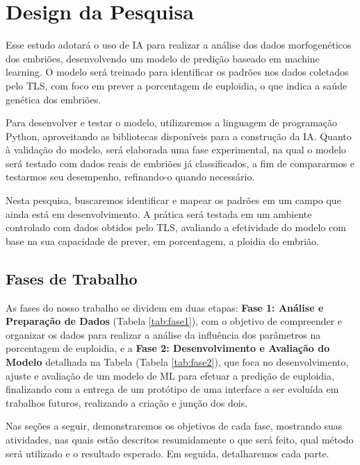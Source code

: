 \section{Design da Pesquisa}

Esse estudo adotará o uso de IA para realizar a análise dos dados morfogenéticos dos embriões, desenvolvendo um modelo de predição baseado em machine learning. O modelo será treinado para identificar os padrões nos dados coletados pelo TLS, com foco em prever a porcentagem de euploidia, o que indica a saúde genética dos embriões.

Para desenvolver e testar o modelo, utilizaremos a linguagem de programação Python, aproveitando as bibliotecas disponíveis para a construção da IA. Quanto à validação do modelo, será elaborada uma fase experimental, na qual o modelo será testado com dados reais de embriões já classificados, a fim de compararmos e testarmos seu desempenho, refinando-o quando necessário.

Nesta pesquisa, buscaremos identificar e mapear os padrões em um campo que ainda está em desenvolvimento. A prática será testada em um ambiente controlado com dados obtidos pelo TLS, avaliando a efetividade do modelo com base na sua capacidade de prever, em porcentagem, a ploidia do embrião.

\subsection{Fases de Trabalho}

As fases do nosso trabalho se dividem em duas etapas: \textbf{Fase 1: Análise e Preparação de Dados} (Tabela \ref{tab:fase1}), com o objetivo de compreender e organizar os dados para realizar a análise da influência dos parâmetros na porcentagem de euploidia, e a \textbf{Fase 2: Desenvolvimento e Avaliação do Modelo} detalhada na Tabela (Tabela \ref{tab:fase2}), que foca no desenvolvimento, ajuste e avaliação de um modelo de ML para efetuar a predição de euploidia, finalizando com a entrega de um protótipo de uma interface a ser evoluída em trabalhos futuros, realizando a criação e junção dos dois.

Nas seções a seguir, demonstraremos os objetivos de cada fase, mostrando suas atividades, nas quais estão descritos resumidamente o que será feito, qual método será utilizado e o resultado esperado. Em seguida, detalharemos cada parte.

